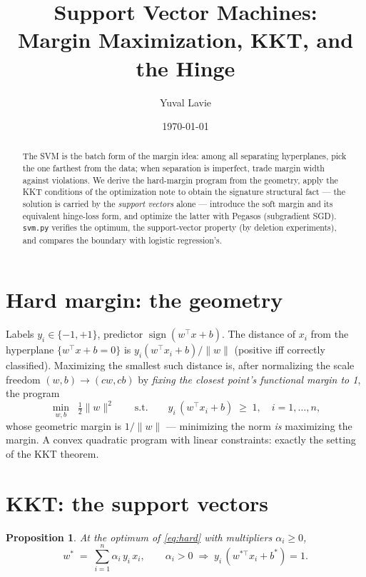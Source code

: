 \documentclass[11pt]{article}
\title{Support Vector Machines:\\
Margin Maximization, KKT, and the Hinge}
\author{Yuval Lavie}
\date{\today}
\newtheorem{proposition}{Proposition}
\begin{document}
\maketitle

\begin{abstract}
The SVM is the batch form of the margin idea: among all separating
hyperplanes, pick the one farthest from the data; when separation is
imperfect, trade margin width against violations. We derive the
hard-margin program from the geometry, apply the KKT conditions of the
optimization note to obtain the signature structural fact --- the
solution is carried by the \emph{support vectors} alone --- introduce the
soft margin and its equivalent hinge-loss form, and optimize the latter
with Pegasos (subgradient SGD). \texttt{svm.py} verifies the optimum, the
support-vector property (by deletion experiments), and compares the
boundary with logistic regression's.
\end{abstract}

\section{Hard margin: the geometry}

Labels $y_i \in \{-1,+1\}$, predictor
$\operatorname{sign}(w^\top x + b)$. The distance of $x_i$ from the
hyperplane $\{w^\top x + b = 0\}$ is
$y_i(w^\top x_i + b)/\lVert w\rVert$ (positive iff correctly classified).
Maximizing the smallest such distance is, after normalizing the scale
freedom $(w,b) \to (cw, cb)$ by \emph{fixing the closest point's
functional margin to 1}, the program
\begin{equation}
  \min_{w,b}\;\; \tfrac12\lVert w\rVert^2
  \qquad\text{s.t.}\qquad
  y_i\,(w^\top x_i + b) \;\ge\; 1, \quad i = 1,\dots,n ,
  \label{eq:hard}
\end{equation}
whose geometric margin is $1/\lVert w\rVert$ --- minimizing the norm
\emph{is} maximizing the margin. A convex quadratic program with linear
constraints: exactly the setting of the KKT theorem.

\section{KKT: the support vectors}

\begin{proposition}
At the optimum of \eqref{eq:hard} with multipliers $\alpha_i \ge 0$,
\begin{equation}
  \boxed{\;w^\ast \;=\; \sum_{i=1}^n \alpha_i\, y_i\, x_i,
  \qquad
  \alpha_i > 0 \;\Longrightarrow\; y_i\,(w^{\ast\top} x_i + b^\ast) = 1 .\;}
  \label{eq:kkt}
\end{equation}
\end{proposition}
\end{document}
